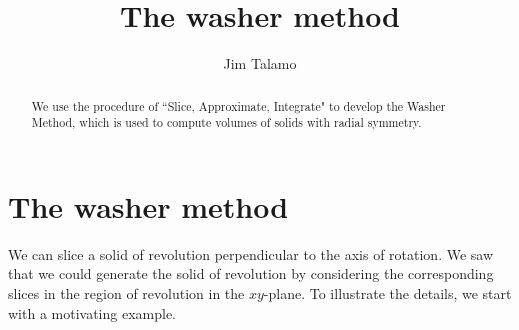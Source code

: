 \documentclass{ximera}
\author{Jim Talamo}
\title[Dig-In:]{The washer method}
\begin{document}
\begin{abstract}
We use the procedure of ``Slice, Approximate, Integrate" to develop the Washer Method, which is used to compute volumes of solids with radial symmetry.
\end{abstract}
\maketitle


\section{The washer method}

We can slice a solid of revolution perpendicular to the axis of rotation.  We saw that we could generate the solid of revolution by considering the corresponding slices in the region of revolution in the $xy$-plane.  To illustrate the details, we start with a motivating example.  
\end{document}
